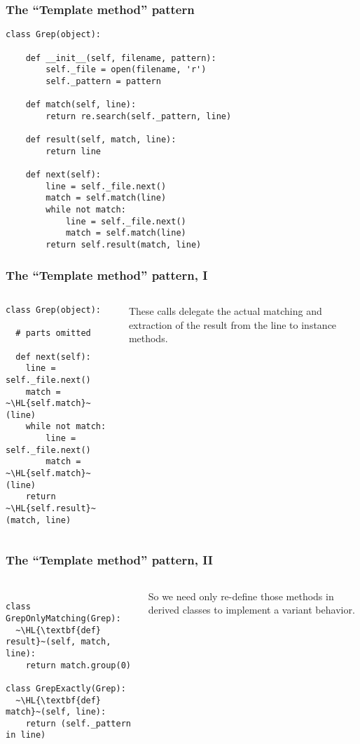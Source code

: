 \documentclass[english,serif,mathserif,xcolor=pdftex,dvipsnames,table]{beamer}
\begin{document}
\begin{frame}[fragile]
  \frametitle{The ``Template method'' pattern}
\begin{lstlisting}
class Grep(object):

    def __init__(self, filename, pattern):
        self._file = open(filename, 'r')
        self._pattern = pattern

    def match(self, line):
        return re.search(self._pattern, line)

    def result(self, match, line):
        return line

    def next(self):
        line = self._file.next()
        match = self.match(line)
        while not match:
            line = self._file.next()
            match = self.match(line)
        return self.result(match, line)
\end{lstlisting}
\end{frame}


\begin{frame}[fragile]
  \frametitle{The ``Template method'' pattern, I}
  \begin{columns}[t]
    \begin{column}{0.5\textwidth}
\begin{lstlisting}
class Grep(object):

  # parts omitted

  def next(self):
    line = self._file.next()
    match = ~\HL{self.match}~(line)
    while not match:
        line = self._file.next()
        match = ~\HL{self.match}~(line)
    return ~\HL{self.result}~(match, line)
\end{lstlisting}
    \end{column}
    \begin{column}{0.5\textwidth}
      \raggedleft
      These calls delegate the actual matching and
      extraction of the result from the line to instance methods.
    \end{column}
  \end{columns}
\end{frame}


\begin{frame}[fragile]
  \frametitle{The ``Template method'' pattern, II}
  \begin{columns}[t]
    \begin{column}{0.5\textwidth}
\begin{lstlisting}

class GrepOnlyMatching(Grep):
  ~\HL{\textbf{def} result}~(self, match, line):
    return match.group(0)

class GrepExactly(Grep):
  ~\HL{\textbf{def} match}~(self, line):
    return (self._pattern in line)
\end{lstlisting}
    \end{column}
    \begin{column}{0.5\textwidth}
      \raggedleft
      So we need only re-define those methods in derived
      classes to implement a variant behavior.
    \end{column}
  \end{columns}
\end{frame}
\end{document}
